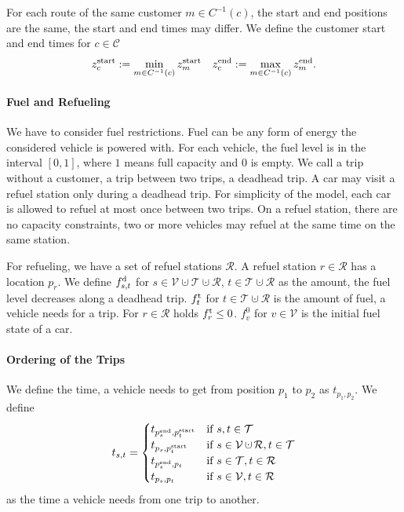For each route of the same customer $m\in C^{-1}(c)$, the start and end positions are the same, the start and end times may differ. We define the customer start and end times for $c\in\mathcal{C}$
\begin{align*}
	z^{\operatorname{start}}_c := \min_{m\in C^{-1}(c)}z^{\operatorname{start}}_m & & z^{\operatorname{end}}_c := \max_{m\in C^{-1}(c)}z^{\operatorname{end}}_m .
\end{align*}

\paragraph{Fuel and Refueling} \parfill

We have to consider fuel restrictions. Fuel can be any form of energy the considered vehicle is powered with. For each vehicle, the fuel level is in the interval $[0,1]$, where $1$ means full capacity and $0$ is empty. We call a trip without a customer, \ie a trip between two trips, a deadhead trip. A car may visit a refuel station only during a deadhead trip. For simplicity of the model, each car is allowed to refuel at most once between two trips. On a refuel station, there are no capacity constraints, \ie two or more vehicles may refuel at the same time on the same station.

For refueling, we have a set of refuel stations $\mathcal{R}$. A refuel station $r\in\mathcal{R}$ has a location $p_r$. We define $f^{\operatorname{d}}_{s,t}$ for $s\in\mathcal{V}\cupdot\mathcal{T}\cupdot\mathcal{R}$, $t\in\mathcal{T}\cupdot\mathcal{R}$ as the amount, the fuel level decreases along a deadhead trip. $f^{\operatorname{t}}_t$ for $t\in\mathcal{T}\cupdot\mathcal{R}$ is the amount of fuel, a vehicle needs for a trip. For $r\in\mathcal{R}$ holds $f^{\operatorname{t}}_r \leq 0$. $f^0_v$ for $v\in\mathcal{V}$ is the initial fuel state of a car.

\paragraph{Ordering of the Trips} \parfill

We define the time, a vehicle needs to get from position $p_1$ to $p_2$ as $t_{p_1,p_2}$. We define
\begin{equation*}
	t_{s,t} = 
	\begin{cases}
		t_{\pend_s,\pstart_t} & \text{if } s,t\in\mathcal{T} \\
		t_{p_s,\pstart_t} & \text{if } s\in\mathcal{V}\cupdot\mathcal{R}, t\in\mathcal{T} \\
		t_{\pend_s,p_t} & \text{if } s\in\mathcal{T}, t\in\mathcal{R} \\
		t_{p_s,p_t} & \text{if } s\in\mathcal{V},t\in\mathcal{R}
	\end{cases}
\end{equation*}
as the time a vehicle needs from one trip to another.

